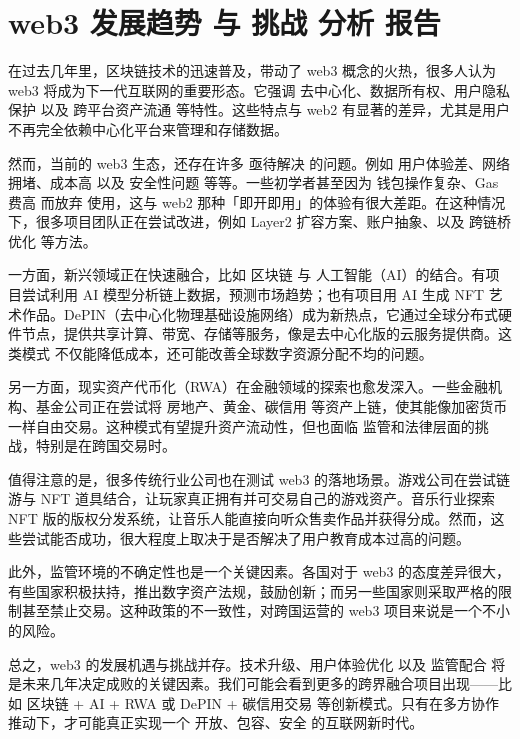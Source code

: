 \documentclass{article}
\author{Max Zhang}
\date{February 2026}
\begin{document}
\section{web3 发展趋势 与 挑战 分析 报告}

在过去几年里，区块链技术的迅速普及，带动了 web3 概念的火热，很多人认为 web3 将成为下一代互联网的重要形态。它强调 去中心化、数据所有权、用户隐私保护 以及 跨平台资产流通 等特性。这些特点与 web2 有显著的差异，尤其是用户不再完全依赖中心化平台来管理和存储数据。

然而，当前的 web3 生态，还存在许多 亟待解决 的问题。例如 用户体验差、网络拥堵、成本高 以及 安全性问题 等等。一些初学者甚至因为 钱包操作复杂、Gas 费高 而放弃 使用，这与 web2 那种「即开即用」的体验有很大差距。在这种情况下，很多项目团队正在尝试改进，例如 Layer2 扩容方案、账户抽象、以及 跨链桥优化 等方法。

一方面，新兴领域正在快速融合，比如 区块链 与 人工智能（AI）的结合。有项目尝试利用 AI 模型分析链上数据，预测市场趋势；也有项目用 AI 生成 NFT 艺术作品。DePIN（去中心化物理基础设施网络）成为新热点，它通过全球分布式硬件节点，提供共享计算、带宽、存储等服务，像是去中心化版的云服务提供商。这类模式 不仅能降低成本，还可能改善全球数字资源分配不均的问题。

另一方面，现实资产代币化（RWA）在金融领域的探索也愈发深入。一些金融机构、基金公司正在尝试将 房地产、黄金、碳信用 等资产上链，使其能像加密货币一样自由交易。这种模式有望提升资产流动性，但也面临 监管和法律层面的挑战，特别是在跨国交易时。

值得注意的是，很多传统行业公司也在测试 web3 的落地场景。游戏公司在尝试链游与 NFT 道具结合，让玩家真正拥有并可交易自己的游戏资产。音乐行业探索 NFT 版的版权分发系统，让音乐人能直接向听众售卖作品并获得分成。然而，这些尝试能否成功，很大程度上取决于是否解决了用户教育成本过高的问题。

此外，监管环境的不确定性也是一个关键因素。各国对于 web3 的态度差异很大，有些国家积极扶持，推出数字资产法规，鼓励创新；而另一些国家则采取严格的限制甚至禁止交易。这种政策的不一致性，对跨国运营的 web3 项目来说是一个不小的风险。

总之，web3 的发展机遇与挑战并存。技术升级、用户体验优化 以及 监管配合 将是未来几年决定成败的关键因素。我们可能会看到更多的跨界融合项目出现——比如 区块链 + AI + RWA 或 DePIN + 碳信用交易 等创新模式。只有在多方协作推动下，才可能真正实现一个 开放、包容、安全 的互联网新时代。
\end{document}

